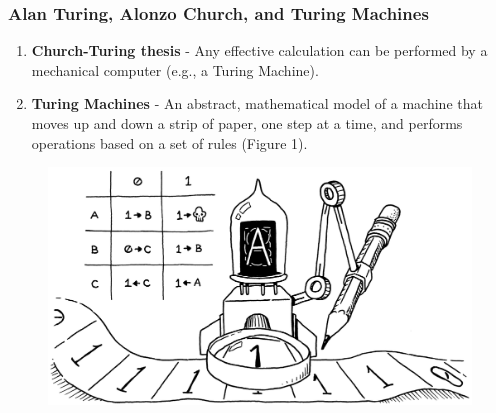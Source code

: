 \documentclass{beamer}
\begin{document}
%
%
\begin{frame}
  \frametitle{Alan Turing, Alonzo Church, and Turing Machines}
  \begin{minipage}{0.59\textwidth}
    \begin{enumerate}
      \item \textbf{Church-Turing thesis} - Any effective calculation can be performed by a mechanical computer (e.g., a Turing Machine).
      \item \textbf{Turing Machines} - An abstract, mathematical model of a machine that moves up and down a strip of paper, one step at a time, and performs operations based on a set of rules (Figure 1).
    \end{enumerate}
  \end{minipage}
  \begin{minipage}{0.39\textwidth}
    \begin{figure}
      \includegraphics[width=\textwidth]{imgs/turing-machine.png}
    \end{figure}
  \end{minipage}
\end{frame}

%
%
\begin{frame}
  \frametitle{}
\end{frame}

%
%
\begin{frame}
  \frametitle{}
\end{frame}

%
%
\begin{frame}
  \frametitle{}
\end{frame}
\end{document}
